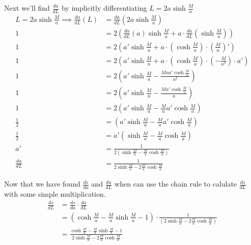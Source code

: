 \documentclass[12pt]{article}
\begin{document}
\indent Next we'll find $\frac{da}{dL}$ by implicitly differentiating $L = 2a\sinh{\frac{M}{a}}$ \\
\begin{align} \nonumber
L = 2a\sinh{\frac{M}{a}} \implies \frac{da}{dL}(L) &= \frac{da}{dL}\left( 2a \sinh{\frac{M}{a}} \right) \\ \nonumber
1 &= 2\left(\frac{da}{dL}(a) \sinh{\frac{M}{a}} + a \cdot \frac{da}{dL}\left( \sinh{\frac{M}{a}}\right)\right) \\ \nonumber
1 &= 2\left(a' \sinh{\frac{M}{a}} + a \cdot \left( \cosh{\frac{M}{a}}\right) \cdot \left(\frac{M}{a}\right)'\right) \\ \nonumber
1 &= 2\left(a' \sinh{\frac{M}{a}} + a \cdot \left( \cosh{\frac{M}{a}}\right) \cdot \left(-\frac{M}{a^2}\right) \cdot a'\right) \\ \nonumber
1 &= 2\left(a' \sinh{\frac{M}{a}} - \frac{Maa'\cosh{\frac{M}{a}}}{a^2}\right) \\ \nonumber
1 &= 2\left(a' \sinh{\frac{M}{a}} - \frac{Ma'\cosh{\frac{M}{a}}}{a}\right) \\ \nonumber
1 &= 2\left(a' \sinh{\frac{M}{a}} - \frac{M}{a}a'\cosh{\frac{M}{a}}\right) \\ \nonumber
\frac{1}{2} &= \left(a' \sinh{\frac{M}{a}} - \frac{M}{a}a'\cosh{\frac{M}{a}}\right) \\ \nonumber
\frac{1}{2} &= a'\left(\sinh{\frac{M}{a}} - \frac{M}{a}\cosh{\frac{M}{a}}\right) \\ \nonumber
a' &= \frac{1}{2\left(\sinh{\frac{M}{a}} - \frac{M}{a}\cosh{\frac{M}{a}}\right)} \\ \nonumber
\frac{da}{dL} &= \frac{1}{2\sinh{\frac{M}{a}} - 2\frac{M}{a}\cosh{\frac{M}{a}}}
\end{align}

\indent Now that we have found $\frac{ds}{da}$ and $\frac{da}{dL}$ when can use the chain rule to calulate $\frac{ds}{dL}$ with some simple multiplication.
\begin{align} \nonumber
\frac{ds}{dL} &= \frac{ds}{da} \cdot \frac{da}{dL} \\ \nonumber
&= \left(\cosh{\frac{M}{a}} - \frac{M}{a} \sinh{\frac{M}{a}} -1\right) \cdot \frac{1}{\left(2\sinh{\frac{M}{a}} - 2\frac{M}{a}\cosh{\frac{M}{a}}\right)} \\ \nonumber
&= \frac{\cosh{\frac{M}{a}} - \frac{M}{a} \sinh{\frac{M}{a}} -1}{2\sinh{\frac{M}{a}} - 2\frac{M}{a}\cosh{\frac{M}{a}}}
\end{align}
\newpage
\end{document}
